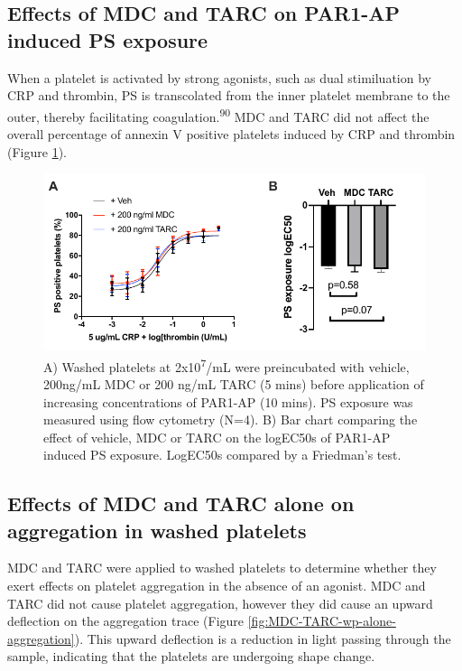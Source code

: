 \documentclass[11pt,twoside]{bristolthesis}
\begin{document}
\hypertarget{effects-of-mdc-and-tarc-on-par1-ap-induced-ps-exposure}{%
\subsection{Effects of MDC and TARC on PAR1-AP induced PS exposure}\label{effects-of-mdc-and-tarc-on-par1-ap-induced-ps-exposure}}

When a platelet is activated by strong agonists, such as dual stimiluation by CRP and thrombin, PS is transcolated from the inner platelet membrane to the outer, thereby facilitating coagulation.\textsuperscript{90} MDC and TARC did not affect the overall percentage of annexin V positive platelets induced by CRP and thrombin (Figure \ref{fig:MDC-TARC-PS-exposure}).



\begin{figure}
\includegraphics{figure/Chemokines/Layouts/MDC_TARC_PS_exposure_layout} \caption[The effect of the chemokines MDC and TARC on PAR1-AP induced PS exposure]{A) Washed platelets at 2x10\textsuperscript{7}/mL were preincubated with vehicle, 200ng/mL MDC or 200 ng/mL TARC (5 mins) before application of increasing concentrations of PAR1-AP (10 mins). PS exposure was measured using flow cytometry (N=4). B) Bar chart comparing the effect of vehicle, MDC or TARC on the logEC50s of PAR1-AP induced PS exposure. LogEC50s compared by a Friedman's test.}\label{fig:MDC-TARC-PS-exposure}
\end{figure}
\hypertarget{effects-of-mdc-and-tarc-alone-on-aggregation-in-washed-platelets}{%
\subsection{Effects of MDC and TARC alone on aggregation in washed platelets}\label{effects-of-mdc-and-tarc-alone-on-aggregation-in-washed-platelets}}

MDC and TARC were applied to washed platelets to determine whether they exert effects on platelet aggregation in the absence of an agonist. MDC and TARC did not cause platelet aggregation, however they did cause an upward deflection on the aggregation trace (Figure \ref{fig:MDC-TARC-wp-alone-aggregation}). This upward deflection is a reduction in light passing through the sample, indicating that the platelets are undergoing shape change.
\end{document}
